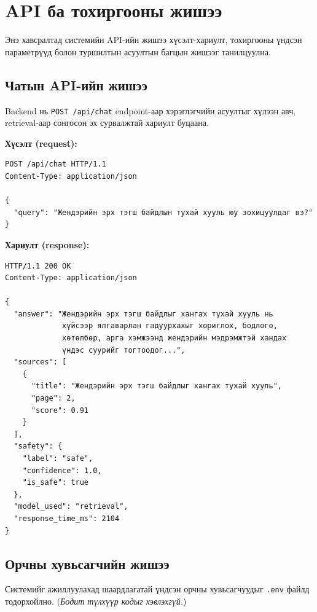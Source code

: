 
\chapter{API ба тохиргооны жишээ}
\label{AppendixA}

Энэ хавсралтад системийн API-ийн жишээ хүсэлт-хариулт, тохиргооны үндсэн параметрүүд болон туршилтын асуултын багцын жишээг танилцуулна.


\section{Чатын API-ийн жишээ}

Backend нь \texttt{POST /api/chat} endpoint-аар хэрэглэгчийн асуултыг хүлээн авч, retrieval-аар сонгосон эх сурвалжтай хариулт буцаана.

\textbf{Хүсэлт (request):}

\begin{verbatim}
POST /api/chat HTTP/1.1
Content-Type: application/json

{
  "query": "Жендэрийн эрх тэгш байдлын тухай хууль юу зохицуулдаг вэ?"
}
\end{verbatim}

\textbf{Хариулт (response):}

\begin{verbatim}
HTTP/1.1 200 OK
Content-Type: application/json

{
  "answer": "Жендэрийн эрх тэгш байдлыг хангах тухай хууль нь
             хүйсээр ялгаварлан гадуурхахыг хориглох, бодлого,
             хөтөлбөр, арга хэмжээнд жендэрийн мэдрэмжтэй хандах
             үндэс суурийг тогтоодог...",
  "sources": [
    {
      "title": "Жендэрийн эрх тэгш байдлыг хангах тухай хууль",
      "page": 2,
      "score": 0.91
    }
  ],
  "safety": {
    "label": "safe",
    "confidence": 1.0,
    "is_safe": true
  },
  "model_used": "retrieval",
  "response_time_ms": 2104
}
\end{verbatim}


\section{Орчны хувьсагчийн жишээ}

Системийг ажиллуулахад шаардлагатай үндсэн орчны хувьсагчуудыг \texttt{.env} файлд тодорхойлно. (\textit{Бодит түлхүүр кодыг хэвлэхгүй.})

